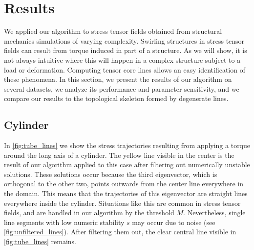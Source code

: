 \section{Results} %
\label{sec:tcl_results}
%
We applied our algorithm to stress tensor fields obtained from structural
mechanics simulations of varying complexity.
%
Swirling structures in stress tensor fields can result from torque induced in
part of a structure.
%
As we will show, it is not always intuitive where this will happen in a complex
structure subject to a load or deformation.
%
Computing tensor core lines allows an easy identification of these phenomena.
%
In this section, we present the results of our algorithm on several datasets, we
analyze its performance and parameter sensitivity, and we compare our results to
the topological skeleton formed by degenerate lines.
%
\subsection{Cylinder} %
\label{sub:torque_applied_to_a_cylinder}
%
In \cref{fig:tube_lines} we show the stress trajectories resulting from applying
a torque around the long axis of a cylinder.
%
The yellow line visible in the center is the result of our algorithm applied to
this case after filtering out numerically unstable solutions.
%
These solutions occur because the third eigenvector, which is orthogonal to the
other two, points outwards from the center line everywhere in the domain.
%
This means that the trajectories of this eigenvector are straight lines
everywhere inside the cylinder.
%
Situations like this are common in stress tensor fields, and are handled in our
algorithm by the threshold $M$.
%
Nevertheless, single line segments with low numeric stability $s$ may occur due
to noise (see \cref{fig:unfiltered_lines}).
%
After filtering them out, the clear central line visible in
\cref{fig:tube_lines} remains.
%
%
